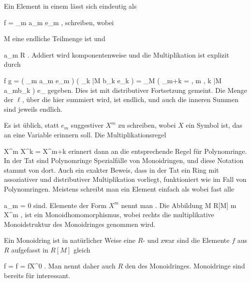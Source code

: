 {}
{





Ein Element in einem
lässt sich eindeutig als

\mavergleichskettedisp
{\vergleichskette
{ f
}
{ =} { \sum_{m \in {} } a_m e_m
}
{ } {
}
{ } {
}
{ } {
}
}
{}{}{,}
schreiben, wobei

\mavergleichskette
{\vergleichskette
{ 
}
{ \subseteq }{ M
}
{  }{
}
{    }{
}
{   }{
}
}
{}{}{}
eine endliche Teilmenge ist und

\mavergleichskette
{\vergleichskette
{ a_m
}
{ \in }{ R
}
{  }{
}
{    }{
}
{   }{
}
}
{}{}{.}
Addiert wird komponentenweise und die Multiplikation ist explizit durch

\mavergleichskettedisp
{\vergleichskette
{ f \cdot g
}
{ =} { \left(  \sum_{m \in {} } a_m e_m  \right) \left(  \sum_{k \in \bar{M} } b_k e_k  \right)
}
{ =} { \sum_{\ell \in M} \left(  \sum_{m+k = \ell, m \in {}, k \in \bar{M} } a_mb_k  \right) e_\ell
}
{ } {}
{ } {}
}
{}{}{}
gegeben. Dies ist mit distributiver Fortsetzung gemeint. Die Menge der $\ell$, über die hier summiert wird, ist endlich, und auch die inneren Summen sind jeweils endlich.

Es ist üblich, statt $e_m$ suggestiver $X^m$ zu schreiben, wobei $X$ ein Symbol ist, das an eine Variable erinnern soll. Die Multiplikationsregel

\mavergleichskette
{\vergleichskette
{ X^m X^k
}
{ = }{ X^{m+k}
}
{  }{
}
{    }{
}
{   }{
}
}
{}{}{}
erinnert dann an die entsprechende Regel für Polynomringe. In der Tat sind Polynomringe Spezialfälle von Monoidringen, und diese Notation stammt von dort. Auch ein exakter Beweis, dass in der Tat ein Ring mit assoziativer und distributiver Multiplikation vorliegt, funktioniert wie im Fall von Polynomringen. Meistens schreibt man ein Element einfach als
 wobei fast alle

\mavergleichskette
{\vergleichskette
{ a_m
}
{ = }{ 0
}
{  }{
}
{    }{
}
{   }{
}
}
{}{}{}
sind. Elemente der Form $X^m$ nennt man  {.} Die Abbildung
\maabbele {} { M } { R[M]
} { m } { X^m
} {,}
ist ein Monoidhomomorphismus, wobei rechts die multiplikative Monoidstruktur des Monoidringes genommen wird.

Ein Monoidring ist in natürlicher Weise eine
$R$-
und zwar sind die Elemente $f$ aus $R$ aufgefasst in $R[M]$ gleich

\mavergleichskettedisp
{\vergleichskette
{ f
}
{ =} { f 
}
{ =} { fX^0
}
{ } {
}
{ } {
}
}
{}{}{.}
Man nennt daher auch $R$ den  {}  des Monoidringes. Monoidringe sind bereits für
interessant.





}

